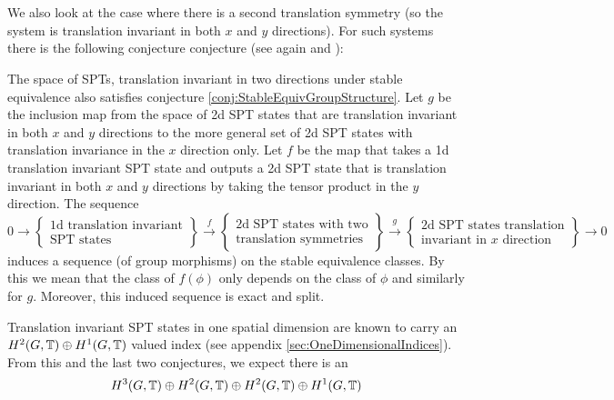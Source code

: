 \documentclass[12pt,a4paper,twoside]{article}
\numberwithin{equation}{section}
\begin{document}
\\\\
We also look at the case where there is a second translation symmetry (so the system is translation invariant in both $x$ and $y$ directions). For such systems there is the following conjecture conjecture (see again \cite{xiong2019classification} and \cite{Chen_2013}):
\begin{conjecture}\label{conj2}
	The space of SPTs, translation invariant in two directions under stable equivalence also satisfies conjecture \ref{conj:StableEquivGroupStructure}. Let $g$ be the inclusion map from the space of 2d SPT states that are translation invariant in both $x$ and $y$ directions to the more general set of 2d SPT states with translation invariance in the $x$ direction only. Let $f$ be the map that takes a 1d translation invariant SPT state and outputs a 2d SPT state that is translation invariant in both $x$ and $y$ directions by taking the tensor product in the $y$ direction. The sequence
	\begin{equation}
		0\rightarrow\left\{\begin{matrix}\text{1d translation invariant}\\ \text{SPT states}\end{matrix}\right\}\stackrel{f}{\rightarrow}\left\{\begin{matrix}\text{2d SPT states with two}\\ \text{translation symmetries}\end{matrix}\right\}\stackrel{g}{\rightarrow}\left\{\begin{matrix}\text{2d SPT states translation}\\ \text{invariant in $x$ direction}\end{matrix}\right\}\rightarrow 0
	\end{equation}
	induces a sequence (of group morphisms) on the stable equivalence classes. By this we mean that the class of $f(\phi)$ only depends on the class of $\phi$ and similarly for $g$. Moreover, this induced sequence is exact and split.
\end{conjecture}
Translation invariant SPT states in one spatial dimension are known to carry an $H^2(G,\mathbb T)\oplus H^1(G,\mathbb T)$ valued index (see appendix \ref{sec:OneDimensionalIndices}). From this and the last two conjectures, we expect there is an
\begin{equation}\label{eq:2TranslationsIntroduction}
	H^3(G,\mathbb T)\oplus H^2(G,\mathbb T)\oplus H^2(G,\mathbb T)\oplus H^1(G,\mathbb T)
\end{equation}
\end{document}
